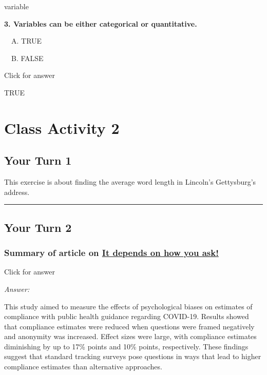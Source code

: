 \documentclass[
]{book}
\begin{document}
variable

\textbf{3. Variables can be either categorical or quantitative.}

 A. TRUE

 B. FALSE

Click for answer

TRUE

\hypertarget{class-activity-2}{%
\chapter{Class Activity 2}\label{class-activity-2}}

\hypertarget{your-turn-1-1}{%
\section{Your Turn 1}\label{your-turn-1-1}}

This exercise is about finding the average word length in Lincoln's Gettysburg's address.

\begin{center}\rule{0.5\linewidth}{0.5pt}\end{center}

\hypertarget{your-turn-2-1}{%
\section{Your Turn 2}\label{your-turn-2-1}}

\hypertarget{summary-of-article-on-it-depends-on-how-you-ask}{%
\subsection{\texorpdfstring{Summary of article on \href{https://jech.bmj.com/content/75/4/387.abstract}{It depends on how you ask!}}{Summary of article on It depends on how you ask!}}\label{summary-of-article-on-it-depends-on-how-you-ask}}

Click for answer

\emph{Answer:}

This study aimed to measure the effects of psychological biases on estimates of compliance with public health guidance regarding COVID-19. Results showed that compliance estimates were reduced when questions were framed negatively and anonymity was increased. Effect sizes were large, with compliance estimates diminishing by up to 17\% points and 10\% points, respectively. These findings suggest that standard tracking surveys pose questions in ways that lead to higher compliance estimates than alternative approaches.
\end{document}
